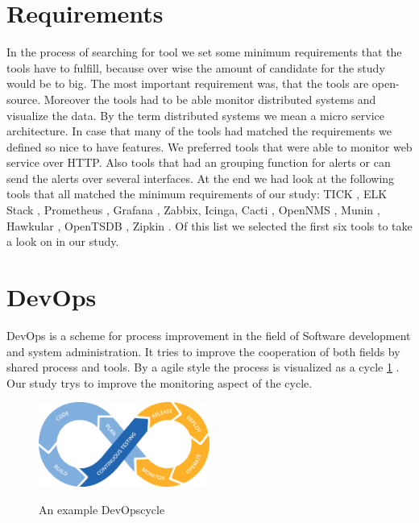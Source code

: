 \section{Requirements}
\label{minimumrequire}
In the process of searching for tool we set some minimum requirements that the tools have to fulfill, because over wise the amount of candidate for the study would be to big. The most important requirement was, that the tools are open-source. Moreover the tools had to be able monitor distributed systems and visualize the data. By the term distributed systems we  mean a micro service architecture.
In case that many of the tools had matched the requirements we defined so nice to have features. We preferred tools that were able to monitor web service over HTTP. Also tools that had an grouping function for alerts or can send the alerts over several interfaces.
At the end we had look at the following tools that all matched the minimum requirements of our study: TICK \cite{tick}, ELK Stack \cite{elk}, Prometheus \cite{prometheus}, Grafana \cite{grafana} \cite{grafana}, Zabbix\cite{zabbix}, Icinga\cite{icinga}, Cacti \cite{cacti}, OpenNMS \cite{opennms}, Munin \cite{munin}, Hawkular \cite{hawkular}, OpenTSDB \cite{opentsdb}, Zipkin \cite{zipkin}. Of this list we selected the first six tools to take a look on in our study.   


\section{DevOps}
\label{devops}
DevOps is a scheme for process improvement in the field of Software development and system administration\cite{Bass:2015:DSA:2810087}. It tries to improve the cooperation of both fields by shared process and tools.
By a agile style the process is visualized as a cycle \cref{fig:devopscycle} . Our study trys to improve the monitoring aspect of the cycle.
\begin{figure}
	\centering
	\includegraphics[width=0.5\textwidth]{Bilder/devopscycle}
	\caption{An example DevOpscycle}
	\label{fig:devopscycle}
	\cite{Devops}
\end{figure}